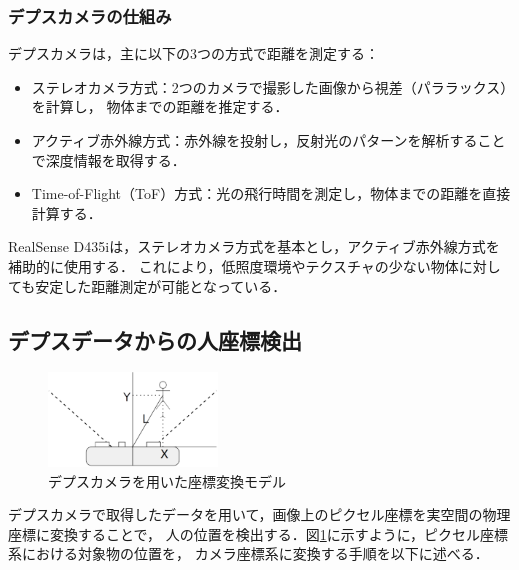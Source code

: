 \subsubsection{デプスカメラの仕組み}
デプスカメラは，主に以下の3つの方式で距離を測定する：
\begin{itemize}
    \item ステレオカメラ方式：2つのカメラで撮影した画像から視差（パララックス）を計算し，
          物体までの距離を推定する．
    \item アクティブ赤外線方式：赤外線を投射し，反射光のパターンを解析することで深度情報を取得する．
    \item Time-of-Flight（ToF）方式：光の飛行時間を測定し，物体までの距離を直接計算する．
\end{itemize}

RealSense D435iは，ステレオカメラ方式を基本とし，アクティブ赤外線方式を補助的に使用する．
これにより，低照度環境やテクスチャの少ない物体に対しても安定した距離測定が可能となっている．

\subsection{デプスデータからの人座標検出}

\begin{figure}[h]
    \centering
    \includegraphics[width=0.4\textwidth]{figure/rialsens_man.pdf}
    \caption{デプスカメラを用いた座標変換モデル}
    \label{fig:coordinate_conversion}
\end{figure}

デプスカメラで取得したデータを用いて，画像上のピクセル座標を実空間の物理座標に変換することで，
人の位置を検出する．図\ref{fig:coordinate_conversion}に示すように，ピクセル座標系における対象物の位置を，
カメラ座標系に変換する手順を以下に述べる．

